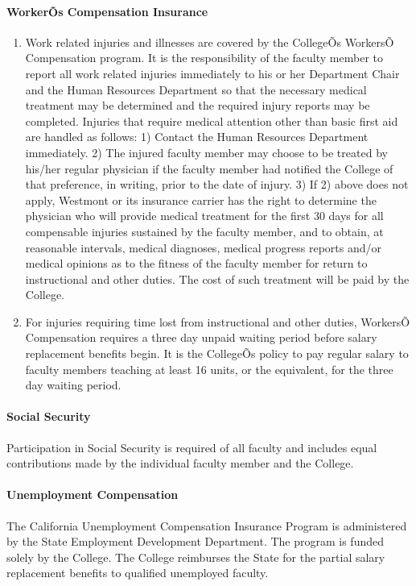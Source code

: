 \documentclass[letterpaper, 11pt]{article}
\begin{document}
			\paragraph{WorkerÕs Compensation Insurance}
				\begin{enumerate}[label=\alph*)]
					\item{Work related injuries and illnesses are covered by the CollegeÕs WorkersÕ Compensation program.  It is the responsibility of the faculty member to report all work related injuries immediately to his or her Department Chair and the Human Resources Department so that the necessary medical treatment may be determined and the required injury reports may be completed. Injuries that require medical attention other than basic first aid are handled as follows:}
					1) Contact the Human Resources Department immediately.
					2) The injured faculty member may choose to be treated by his/her regular physician if the faculty member had notified the College of that preference, in writing, prior to the date of injury.
					3) If 2) above does not apply, Westmont or its insurance carrier has the right to determine the physician who will provide medical treatment for the first 30 days for all compensable injuries sustained by the faculty member, and to obtain, at reasonable intervals, medical diagnoses, medical progress reports and/or medical opinions as to the fitness of the faculty member for return to instructional and other duties.  The cost of such treatment will be paid by the College.
					\item{For injuries requiring time lost from instructional and other duties, WorkersÕ Compensation requires a three day unpaid waiting period before salary replacement benefits begin.  It is the CollegeÕs policy to pay regular salary to faculty members teaching at least 16 units, or the equivalent, for the three day waiting period.}
				\end{enumerate}
			\paragraph{Social Security}
				Participation in Social Security is required of all faculty and includes equal contributions made by the individual faculty member and the College.
			\paragraph{Unemployment Compensation}
				The California Unemployment Compensation Insurance Program is administered by the State Employment Development Department.  The program is funded solely by the College. The College reimburses the State for the partial salary replacement benefits to qualified unemployed faculty.
\end{document}
